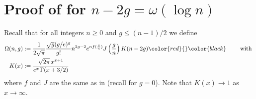 \documentclass[a4paper,12pt]{article}
\theoremstyle{definition}
\newcommand{\largev}{\ensuremath{n-2g =\omega(\log n)}}
\begin{document}
\section{Proof of  for \largev}\label{sec:alpha_beta_largev}




Recall that for all integers $n\geq 0$ and $g\leq (n-1)/2$ we define
\begin{align*}
    \Omega(n,g)&:=\frac{1}{2\sqrt{\pi}} \frac{\sqrt{g}(g/e)^g}{g!}n^{2g-2}e^{nf(\frac{g}{n})}{J}\left(\frac{g}{n}\right)K(n-2g)\color{red}{}\color{black} \qquad \text{ with } \\
    K(x)&:=\frac{\sqrt{2\pi} \, x^{x+1}}{e^{x} \, \Gamma(x+3/2)}
\end{align*}
where $f$ and $J$ are the same as in  (recall  for $g=0$).
Note that $K(x) \rightarrow 1$ as $x\to\infty$.
\end{document}
